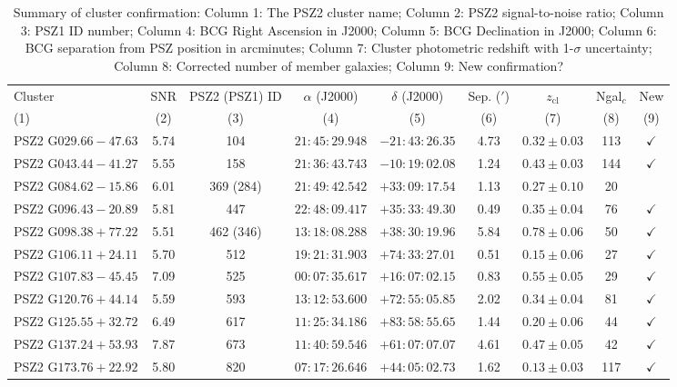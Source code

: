 \documentclass[apj, revtex4-1]{emulateapj}
\begin{document}
\begin{table}
	\caption[Summary of Cluster Confirmation]{Summary of cluster confirmation: Column 1: The PSZ2 cluster name; Column 2: PSZ2 signal-to-noise ratio; Column 3: PSZ1 ID number; Column 4: BCG Right Ascension in J2000; Column 5: BCG Declination in J2000; Column 6: BCG separation from PSZ position in arcminutes; Column 7: Cluster photometric redshift with 1-$\sigma$ uncertainty; Column 8: Corrected number of member galaxies; Column 9: New confirmation? }
	\begin{threeparttable}
	\centering
	\begin{tabular}{lcccccccc}
	\hline
	Cluster & SNR & PSZ2 (PSZ1) ID & $\alpha$ (J2000) & $\delta$ (J2000) & Sep. ($'$) & $z_\mathrm{cl}$ & Ngal$_c$ & New\\
	(1) & (2) & (3) & (4) & (5) & (6) & (7) & (8) & (9) \\
	\hline
	 PSZ2 G$029.66-47.63$ & 5.74 & 104 & $21:45:29.948$ &  $-21:43:26.35$ & 4.73 & $0.32 \pm 0.03$ & 113 & $\checkmark$ \\
	 PSZ2 G$043.44-41.27$ & 5.55 & 158 & $21:36:43.743$ &  $-10:19:02.08$ & 1.24 & $0.43 \pm 0.03$ & 144 & $\checkmark$ \\
	 PSZ2 G$084.62-15.86$ & 6.01 & 369 (284) & $21:49:42.542$ &  $+33:09:17.54$ & 1.13 & $0.27 \pm 0.10$ & 20 & \\
	 PSZ2 G$096.43-20.89$ & 5.81 & 447 & $22:48:09.417$ &  $+35:33:49.30$ & 0.49 & $0.35 \pm 0.04$ & 76 & $\checkmark$ \\
	 PSZ2 G$098.38+77.22$ & 5.51 & 462 (346) & $13:18:08.288$ &  $+38:30:19.96$ & 5.84 & $0.78 \pm 0.06$ & 50\tnote{a} & $\checkmark$ \\
	 PSZ2 G$106.11+24.11$ & 5.70 & 512 & $19:21:31.903$ &  $+74:33:27.01$ & 0.51 & $0.15 \pm 0.06$ & 27 & $\checkmark$ \\
	 PSZ2 G$107.83-45.45$ & 7.09 & 525 & $00:07:35.617$ &  $+16:07:02.15$ & 0.83 & $0.55 \pm 0.05$ & 29 & $\checkmark$ \\
	 PSZ2 G$120.76+44.14$ & 5.59 & 593 & $13:12:53.600$ &  $+72:55:05.85$ & 2.02 & $0.34 \pm 0.04$ & 81 & $\checkmark$ \\
	 PSZ2 G$125.55+32.72$ & 6.49 & 617 & $11:25:34.186$ &  $+83:58:55.65$ & 1.44 & $0.20 \pm 0.06$ & 44 & $\checkmark$ \\
	 PSZ2 G$137.24+53.93$ & 7.87 & 673 & $11:40:59.546$ &  $+61:07:07.07$ & 4.61 & $0.47 \pm 0.05$ & 42 & $\checkmark$ \\
	 PSZ2 G$173.76+22.92$ & 5.80 & 820 & $07:17:26.646$ &  $+44:05:02.73$ & 1.62 & $0.13 \pm 0.03$ & 117 & $\checkmark$ \\

\end{tabular}
\end{threeparttable}
\end{table}
\end{document}
